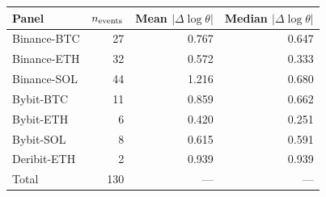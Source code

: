 \begin{tabular}{@{}lrrr@{}}
\toprule
Panel & $n_{\rm events}$ & Mean $|\Delta\!\log\theta|$ & Median $|\Delta\!\log\theta|$ \\
\midrule
Binance-BTC & 27 & 0.767 & 0.647 \\
Binance-ETH & 32 & 0.572 & 0.333 \\
Binance-SOL & 44 & 1.216 & 0.680 \\
Bybit-BTC & 11 & 0.859 & 0.662 \\
Bybit-ETH & 6 & 0.420 & 0.251 \\
Bybit-SOL & 8 & 0.615 & 0.591 \\
Deribit-ETH & 2 & 0.939 & 0.939 \\
\midrule
Total & 130 & --- & --- \\
\bottomrule
\end{tabular}